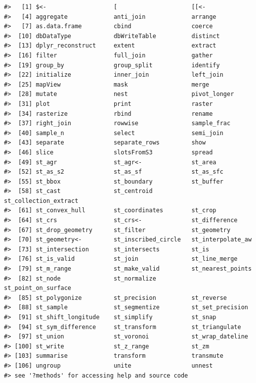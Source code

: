 \documentclass[
  11pt,
]{book}
\begin{document}
\begin{verbatim}
#>   [1] $<-                   [                     [[<-                 
#>   [4] aggregate             anti_join             arrange              
#>   [7] as.data.frame         cbind                 coerce               
#>  [10] dbDataType            dbWriteTable          distinct             
#>  [13] dplyr_reconstruct     extent                extract              
#>  [16] filter                full_join             gather               
#>  [19] group_by              group_split           identify             
#>  [22] initialize            inner_join            left_join            
#>  [25] mapView               mask                  merge                
#>  [28] mutate                nest                  pivot_longer         
#>  [31] plot                  print                 raster               
#>  [34] rasterize             rbind                 rename               
#>  [37] right_join            rowwise               sample_frac          
#>  [40] sample_n              select                semi_join            
#>  [43] separate              separate_rows         show                 
#>  [46] slice                 slotsFromS3           spread               
#>  [49] st_agr                st_agr<-              st_area              
#>  [52] st_as_s2              st_as_sf              st_as_sfc            
#>  [55] st_bbox               st_boundary           st_buffer            
#>  [58] st_cast               st_centroid           st_collection_extract
#>  [61] st_convex_hull        st_coordinates        st_crop              
#>  [64] st_crs                st_crs<-              st_difference        
#>  [67] st_drop_geometry      st_filter             st_geometry          
#>  [70] st_geometry<-         st_inscribed_circle   st_interpolate_aw    
#>  [73] st_intersection       st_intersects         st_is                
#>  [76] st_is_valid           st_join               st_line_merge        
#>  [79] st_m_range            st_make_valid         st_nearest_points    
#>  [82] st_node               st_normalize          st_point_on_surface  
#>  [85] st_polygonize         st_precision          st_reverse           
#>  [88] st_sample             st_segmentize         st_set_precision     
#>  [91] st_shift_longitude    st_simplify           st_snap              
#>  [94] st_sym_difference     st_transform          st_triangulate       
#>  [97] st_union              st_voronoi            st_wrap_dateline     
#> [100] st_write              st_z_range            st_zm                
#> [103] summarise             transform             transmute            
#> [106] ungroup               unite                 unnest               
#> see '?methods' for accessing help and source code
\end{verbatim}
\end{document}
